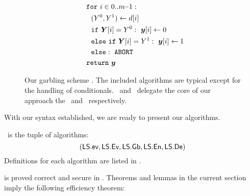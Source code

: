\begin{figure}
\begin{adjustwidth}{-0.1\textwidth}{-0.1\textwidth}
\begin{minipage}[t]{0.40\linewidth}
\begin{align*}
      &~~\cfor~i \in 0.. m\minus 1:\\
      &~~~~(Y^0, Y^1) \gets d[i]\\
      &~~~~\cif~\gcirout[i] = Y^0:~\cirout[i] \gets 0\\
      &~~~~\celse~\cif~\gcirout[i] = Y^1:~\cirout[i] \gets 1\\
      &~~~~\celse:~\mathtt{ABORT}\\
      &~~\creturn~\cirout
    \end{align*}
  \end{minipage}
  \end{adjustwidth}
  \caption{%
    Our garbling scheme \ourschemelong.
    The included algorithms are typical except for the handling of
    conditionals.
    \gEv\ and \gGb\ delegate the core of our approach the \evcond\ and
    \gbcond\ respectively.
  }\label{fig:scheme}
\end{figure}


With our syntax established, we are ready to present our algorithms.
\begin{construction}[\ourschemelong]\label{ourconstr}
  \ourschemelong\ is the tuple of algorithms:
  \[ (\textsf{LS}.\textsf{ev}, \textsf{LS}.\textsf{Ev}, \textsf{LS}.\textsf{Gb}, \textsf{LS}.\textsf{En}, \textsf{LS}.\textsf{De}) \]
  Definitions for each algorithm are listed in .
\end{construction}

 is proved correct and secure in .
Theorems and lemmas in the current section imply the following efficiency theorem:

